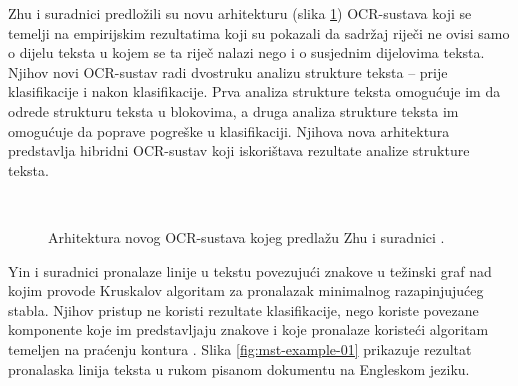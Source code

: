 \documentclass[times, utf8, zavrsni]{fer}
\begin{document}
\pagebreak

Zhu i suradnici \citep{zhu2016novel} predložili su novu arhitekturu (slika \ref{fig:novel-ocr}) OCR-sustava koji se temelji na empirijskim
rezultatima koji su pokazali da sadržaj riječi ne ovisi samo o dijelu teksta u kojem se ta riječ
nalazi nego i o susjednim dijelovima teksta. Njihov novi OCR-sustav radi dvostruku analizu strukture
teksta -- prije klasifikacije i nakon klasifikacije. Prva analiza strukture teksta omogućuje im da odrede
strukturu teksta u blokovima, a druga analiza strukture teksta im omogućuje da poprave pogreške u klasifikaciji.
Njihova nova arhitektura predstavlja hibridni OCR-sustav koji iskorištava rezultate analize strukture teksta.

\

\begin{figure}[htb]
    \centering
    \captionsetup{justification=centering,margin=2cm}
    \caption{Arhitektura novog OCR-sustava kojeg predlažu Zhu i suradnici \citep{zhu2016novel}.}
    \label{fig:novel-ocr}
\end{figure}

\pagebreak

Yin i suradnici \citep{yin2007handwritten} pronalaze linije u tekstu povezujući znakove u težinski
graf nad kojim provode Kruskalov algoritam za pronalazak minimalnog razapinjujućeg stabla. Njihov
pristup ne koristi rezultate klasifikacije, nego koriste povezane komponente koje im predstavljaju
znakove i koje pronalaze koristeći algoritam temeljen na praćenju kontura .
Slika \ref{fig:mst-example-01} prikazuje rezultat pronalaska linija teksta u rukom pisanom dokumentu na
Engleskom jeziku.

\
\end{document}
